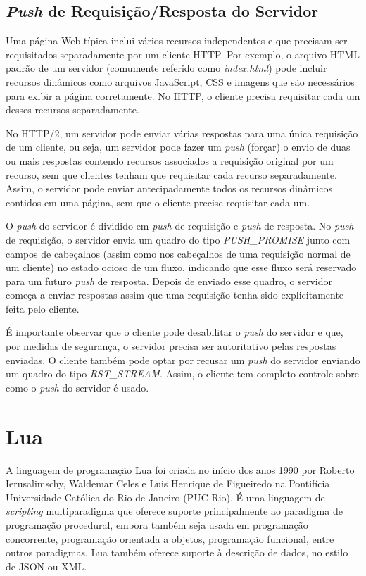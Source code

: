 \subsection{{\em Push} de Requisição\slash Resposta do Servidor}
\label{subsec:push}

Uma página Web típica inclui vários recursos independentes e que precisam ser requisitados separadamente por um cliente HTTP. Por exemplo, o arquivo HTML padrão de um servidor (comumente referido como {\em index.html}) pode incluir recursos dinâmicos como arquivos JavaScript, CSS e imagens que são necessários para exibir a página corretamente. No HTTP, o cliente precisa requisitar cada um desses recursos separadamente.

No HTTP/2, um servidor pode enviar várias respostas para uma única requisição de um cliente, ou seja, um servidor pode fazer um {\em push} (forçar) o envio de duas ou mais respostas contendo recursos associados a requisição original por um recurso, sem que clientes tenham que requisitar cada recurso separadamente. Assim, o servidor pode enviar antecipadamente todos os recursos dinâmicos contidos em uma página, sem que o cliente precise requisitar cada um.

O {\em push} do servidor é dividido em {\em push} de requisição e {\em push} de resposta. No {\em push} de requisição, o servidor envia um quadro do tipo {\em PUSH\_PROMISE} junto com campos de cabeçalhos (assim como nos cabeçalhos de uma requisição normal de um cliente) no estado ocioso de um fluxo, indicando que esse fluxo será reservado para um futuro {\em push} de resposta. Depois de enviado esse quadro, o servidor começa a enviar respostas assim que uma requisição tenha sido explicitamente feita pelo cliente.

É importante observar que o cliente pode desabilitar o {\em push} do servidor e que, por medidas de segurança, o servidor precisa ser autoritativo pelas respostas enviadas. O cliente também pode optar por recusar um {\em push} do servidor enviando um quadro do tipo {\em RST\_STREAM}. Assim, o cliente tem completo controle sobre como o {\em push} do servidor é usado.

\section{Lua}
\label{sec:lua}

A linguagem de programação Lua \cite{Ierusalimschy:2009:PMP:2175094.2175096, Ierusalimschy2016PiL, Ierusalimschy2018:LDL:3289258.3186277}  foi criada no início dos anos 1990 por Roberto Ierusalimschy, Waldemar Celes e Luis Henrique de Figueiredo na Pontifícia Universidade Católica do Rio de Janeiro (PUC-Rio). É uma linguagem de {\em scripting} multiparadigma que oferece suporte principalmente ao paradigma de programação procedural, embora também seja usada em programação concorrente, programação orientada a objetos, programação funcional, entre outros paradigmas. Lua também oferece suporte à descrição de dados, no estilo de JSON ou XML.

